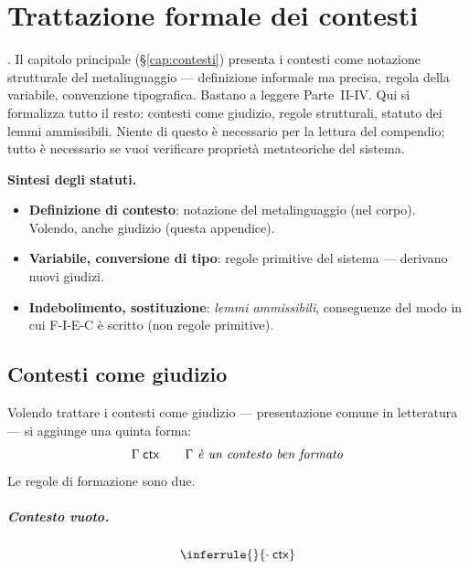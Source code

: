 
\chapter{Trattazione formale dei contesti}\label{cap:contesti-formali}

. Il capitolo principale (\S\ref{cap:contesti}) presenta i contesti come notazione strutturale del metalinguaggio --- definizione informale ma precisa, regola della variabile, convenzione tipografica. Bastano a leggere Parte~II-IV. Qui si formalizza tutto il resto: contesti come giudizio, regole strutturali, statuto dei lemmi ammissibili. Niente di questo \`e necessario per la lettura del compendio; tutto \`e necessario se vuoi verificare propriet\`a metateoriche del sistema.

\bigskip

\noindent\textbf{Sintesi degli statuti.}
\begin{itemize}
\item \textbf{Definizione di contesto}: notazione del metalinguaggio (nel corpo). Volendo, anche giudizio (questa appendice).
\item \textbf{Variabile, conversione di tipo}: regole primitive del sistema --- derivano nuovi giudizi.
\item \textbf{Indebolimento, sostituzione}: \emph{lemmi ammissibili}, conseguenze del modo in cui F-I-E-C \`e scritto (non regole primitive).
\end{itemize}

\section*{Contesti come giudizio}

Volendo trattare i contesti come giudizio --- presentazione comune in letteratura --- si aggiunge una quinta forma:
\[
\Gamma \;\mathsf{ctx} \qquad \text{\textit{$\Gamma$ \`e un contesto ben formato}}
\]
\noindent Le regole di formazione sono due.

\paragraph{Contesto vuoto.}
\[
\inferrule{ }{\cdot \;\mathsf{ctx}}
\]

